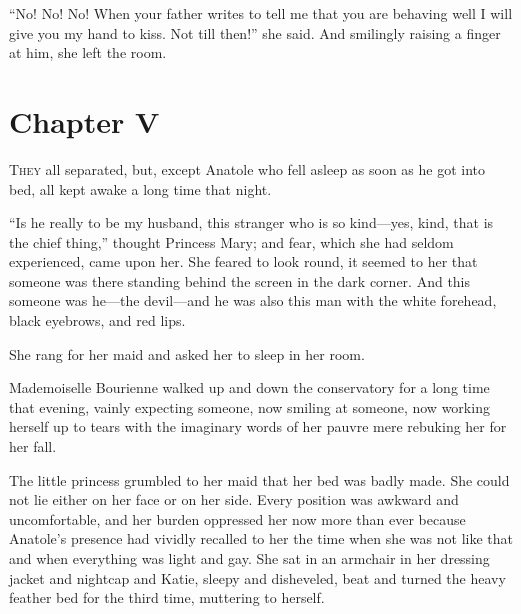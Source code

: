 ``No! No! No! When your father writes to tell me that you are
behaving well I will give you my hand to kiss. Not till then!''
she said. And smilingly raising a finger at him, she left the
room.


\chapter*{Chapter V}
\ifaudio     
{} 
\fi

\lettrine[lines=2, loversize=0.3, lraise=0]{\initfamily T}{hey }
all separated, but, except Anatole who fell asleep as soon
as he got into bed, all kept awake a long time that night.

``Is he really to be my husband, this stranger who is so
kind---yes, kind, that is the chief thing,'' thought Princess
Mary; and fear, which she had seldom experienced, came upon
her. She feared to look round, it seemed to her that someone was
there standing behind the screen in the dark corner. And this
someone was he---the devil---and he was also this man with the
white forehead, black eyebrows, and red lips.

She rang for her maid and asked her to sleep in her room.

Mademoiselle Bourienne walked up and down the conservatory for a
long time that evening, vainly expecting someone, now smiling at
someone, now working herself up to tears with the imaginary words
of her pauvre mere rebuking her for her fall.

The little princess grumbled to her maid that her bed was badly
made.  She could not lie either on her face or on her side. Every
position was awkward and uncomfortable, and her burden oppressed
her now more than ever because Anatole's presence had vividly
recalled to her the time when she was not like that and when
everything was light and gay. She sat in an armchair in her
dressing jacket and nightcap and Katie, sleepy and disheveled,
beat and turned the heavy feather bed for the third time,
muttering to herself.

